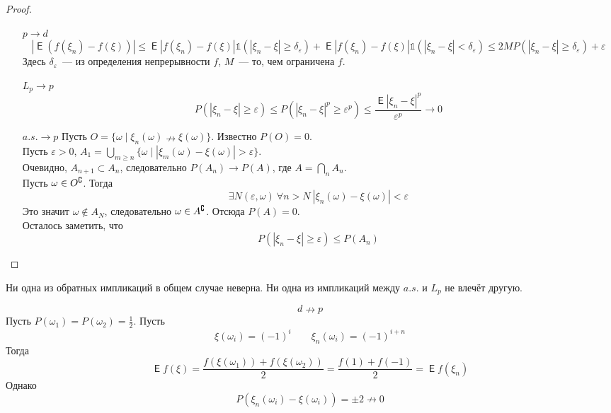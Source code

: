 \documentclass{article}
\DeclareMathOperator{\Expected}{\mathsf{E}}
\begin{document}
    \begin{proof}
        \begin{itemize}
            \item[$p\to d$]
            $$
            |\Expected(f(\xi_n)-f(\xi))|\leqslant\Expected|f(\xi_n)-f(\xi)|\mathbb1(|\xi_n-\xi|\geqslant\delta_\varepsilon)+\Expected|f(\xi_n)-f(\xi)|\mathbb1(|\xi_n-\xi|<\delta_\varepsilon)\leqslant2MP(|\xi_n-\xi|\geqslant\delta_\varepsilon)+\varepsilon
            $$
            Здесь $\delta_\varepsilon$~--- из определения непрерывности $f$, $M$~--- то, чем ограничена $f$.
            \item[$L_p\to p$]
            $$
            P(|\xi_n-\xi|\geqslant\varepsilon)\leqslant
            P(|\xi_n-\xi|^p\geqslant\varepsilon^p)\leqslant
            \frac{\Expected|\xi_n-\xi|^p}{\varepsilon^p}\longrightarrow0
            $$
            \item[$a.s.\to p$]
            Пусть $O=\{\omega\mid\xi_n(\omega)\nrightarrow\xi(\omega)\}$. Известно $P(O)=0$.\\
            Пусть $\varepsilon>0$, $A_1=\bigcup\limits_{m\geqslant n}\{\omega\mid|\xi_m(\omega)-\xi(\omega)|>\varepsilon\}$.\\
            Очевидно, $A_{n+1}\subset A_n$, следовательно $P(A_n)\rightarrow P(A)$, где $A=\bigcap\limits_n A_n$.\\
            Пусть $\omega\in O^\complement$. Тогда
            $$\exists N(\varepsilon,\omega)~\forall n>N~|\xi_n(\omega)-\xi(\omega)|<\varepsilon$$
            Это значит $\omega\notin A_N$, следовательно $\omega\in A^\complement$. Отсюда $P(A)=0$.\\
            Осталось заметить, что
            $$P(|\xi_n-\xi|\geqslant\varepsilon)\leqslant P(A_n)$$
        \end{itemize}
    \end{proof}
    \begin{remark}
        Ни одна из обратных импликаций в общем случае неверна. Ни одна из импликаций между $a.s.$ и $L_p$ не влечёт другую.
    \end{remark}
    \begin{example}
        $$d\nrightarrow p$$
        Пусть $P(\omega_1)=P(\omega_2)=\frac12$. Пусть
        $$
        \xi(\omega_i)=(-1)^i\qquad\xi_n(\omega_i)=(-1)^{i+n}
        $$
        Тогда
        $$
        \Expected f(\xi)=\frac{f(\xi(\omega_1))+f(\xi(\omega_2))}2=\frac{f(1)+f(-1)}2=\Expected f(\xi_n)
        $$
        Однако
        $$
        P(\xi_n(\omega_i)-\xi(\omega_i))=\pm2\nrightarrow0
        $$
    \end{example}
\end{document}
